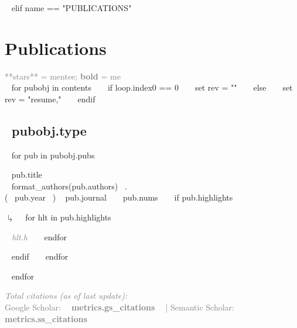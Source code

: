 ~{ elif name == "PUBLICATIONS" }~

\needspace{\headerpush}
\section{Publications}
\textcolor{grey}{**stars** = mentee; \textbf{bold} = me}\\

~{ for pubobj in contents }~ 
~{ if loop.index0 == 0 }~ 
	~{ set rev = "" }~
~{ else }~
	~{ set rev = "resume," }~
~{ endif }~
\subsection{~{{pubobj.type}}~} 
\begin{etaremune}[~{{ rev }}~itemindent=-1.5\bibhang, topsep=0pt,
				   itemsep=\bibsep,partopsep=0pt,parsep=0pt,leftmargin={\bibhang+\widthof{[999]}}] 
    ~{ for pub in pubobj.pubs  }~
    \item ~{{ pub.title }}~ \\
     ~{{ format_authors(pub.authors) }}~. \\ (~{{ pub.year }}~) ~{{ pub.journal }}~ ~{{ pub.nums }}~
     ~{ if pub.highlights }~
     	\begin{list}{$\drsh$}{}
     	~{ for hlt in pub.highlights }~
	      \item \textcolor{grey}{\textit{~{{ hlt.h }}~} }
     	~{ endfor }~
     	\end{list} 
     ~{ endif }~
	~{ endfor }~

\end{etaremune}

~{ endfor }~

\vspace{0.5cm}
\textcolor{grey}{
\textit{Total citations (as of last update):} \\
\textbf{\aiGoogleScholar} \hspace{0.05cm} Google Scholar: \textbf{~{{ metrics.gs_citations }}~} | \textbf{\aiSemanticScholar} \hspace{0.05cm} Semantic Scholar: \textbf{~{{ metrics.ss_citations }}~}\\
}


